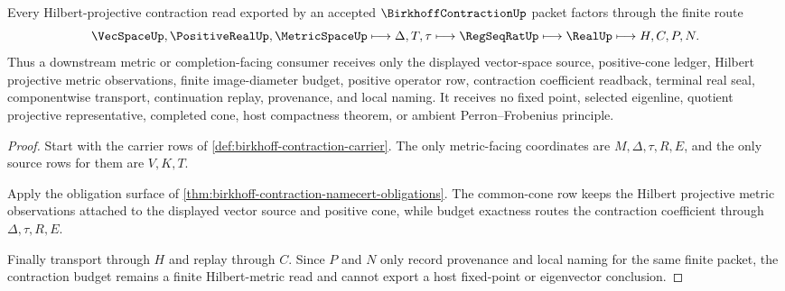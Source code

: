 \begin{theorem}
\label{thm:birkhoff-contraction-hilbert-metric-budget}
Every Hilbert-projective contraction read exported by an accepted $\BirkhoffContractionUp$ packet factors through the finite route
$$
\VecSpaceUp,\PositiveRealUp,\MetricSpaceUp \longmapsto \Delta,T,\tau \longmapsto \RegSeqRatUp \longmapsto \RealUp \longmapsto H,C,P,N .
$$
Thus a downstream metric or completion-facing consumer receives only the displayed vector-space source, positive-cone ledger, Hilbert projective metric observations, finite image-diameter budget, positive operator row, contraction coefficient readback, terminal real seal, componentwise transport, continuation replay, provenance, and local naming. It receives no fixed point, selected eigenline, quotient projective representative, completed cone, host compactness theorem, or ambient Perron--Frobenius principle.
\end{theorem}
\begin{proof}
Start with the carrier rows of \autoref{def:birkhoff-contraction-carrier}. The only metric-facing coordinates are $M,\Delta,\tau,R,E$, and the only source rows for them are $V,K,T$.

Apply the obligation surface of \autoref{thm:birkhoff-contraction-namecert-obligations}. The common-cone row keeps the Hilbert projective metric observations attached to the displayed vector source and positive cone, while budget exactness routes the contraction coefficient through $\Delta,\tau,R,E$.

Finally transport through $H$ and replay through $C$. Since $P$ and $N$ only record provenance and local naming for the same finite packet, the contraction budget remains a finite Hilbert-metric read and cannot export a host fixed-point or eigenvector conclusion.
\end{proof}



